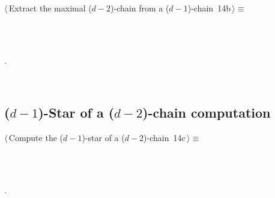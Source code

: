 \documentclass[11pt,oneside]{article}	%
\begin{document}
\begin{flushleft} \small
\begin{minipage}{\linewidth} \label{scrap23}
\protect{}$\langle\,$Extract the maximal ($d-2$)-chain from a ($d-1$)-chain\nobreak\ {\footnotesize 14b}$\,\rangle\equiv$
\vspace{-1ex}
\begin{list}{}{} \item
\mbox{}\verb@@\\
\mbox{}\verb@@\\
\mbox{}\verb@@{\NWsep}
\end{list}
\vspace{-1ex}
\footnotesize\addtolength{\baselineskip}{-1ex}
\begin{list}{}{\setlength{\itemsep}{-\parsep}\setlength{\itemindent}{-\leftmargin}}
\item {\NWtxtMacroNoRef}.
\end{list}
\end{minipage}\\[4ex]
\end{flushleft}

\subsection{($d-1$)-Star of a ($d-2$)-chain computation}

\begin{flushleft} \small
\begin{minipage}{\linewidth} \label{scrap24}
\protect{}$\langle\,$Compute the ($d-1$)-star of a ($d-2$)-chain\nobreak\ {\footnotesize 14c}$\,\rangle\equiv$
\vspace{-1ex}
\begin{list}{}{} \item
\mbox{}\verb@@\\
\mbox{}\verb@@\\
\mbox{}\verb@@{\NWsep}
\end{list}
\vspace{-1ex}
\footnotesize\addtolength{\baselineskip}{-1ex}
\begin{list}{}{\setlength{\itemsep}{-\parsep}\setlength{\itemindent}{-\leftmargin}}
\item {\NWtxtMacroNoRef}.
\end{list}
\end{minipage}\\[4ex]
\end{flushleft}
\end{document}
